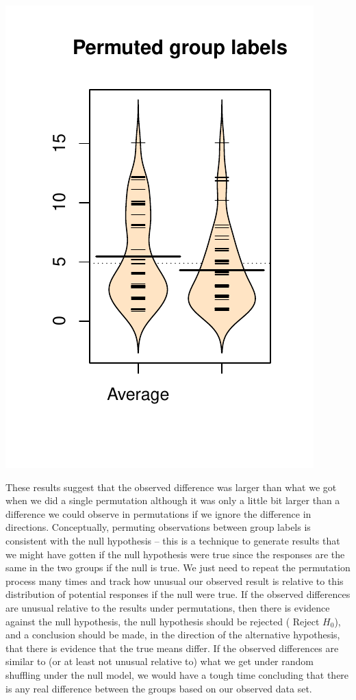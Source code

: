 \documentclass[]{book}
\begin{document}
\includegraphics{GreenwoodBanner_files/figure-latex/Figure2-8-2.pdf}

These results suggest that the observed difference was larger than what
we got when we did a single permutation although it was only a little
bit larger than a difference we could observe in permutations if we
ignore the difference in directions. Conceptually, permuting
observations between group labels is consistent with the null hypothesis
-- this is a technique to generate results that we might have gotten if
the null hypothesis were true since the responses are the same in the
two groups if the null is true. We just need to repeat the permutation
process many times and track how unusual our observed result is relative
to this distribution of potential responses if the null were true. If
the observed differences are unusual relative to the results under
permutations, then there is evidence against the null hypothesis, the
null hypothesis should be rejected ( Reject \(H_0\)), and a conclusion
should be made, in the direction of the alternative hypothesis, that
there is evidence that the true means differ. If the observed
differences are similar to (or at least not unusual relative to) what we
get under random shuffling under the null model, we would have a tough
time concluding that there is any real difference between the groups
based on our observed data set.
\end{document}
